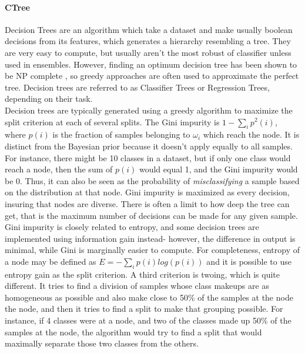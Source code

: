 \paragraph{CTree}
Decision Trees are an algorithm which take a dataset and make usually boolean decisions from its features, which generates a hierarchy resembling a tree.  They are very easy to compute, but usually aren't the most robust of classifier unless used in ensembles.  However, finding an optimum decision tree has been shown to be NP complete \cite{hyafil_constructing_1976}, so greedy approaches are often used to approximate the perfect tree.  Decision trees are referred to as Classifier Trees or Regression Trees, depending on their task.\\
Decision trees are typically generated using a greedy algorithm to maximize the split criterion at each of several splits.  The Gini impurity is $1-\sum_{i}p^2(i)$, where $p(i)$ is the fraction of samples belonging to $\omega_i$ which reach the node.  It is distinct from the Bayesian prior because it doesn't apply equally to all samples.  For instance, there might be 10 classes in a dataset, but if only one class would reach a node, then the sum of $p(i)$ would equal 1, and the Gini impurity would be 0. Thus, it can also be seen as the probability of \textit{misclassifying} a sample based on the distribution at that node. Gini impurity is maximized as every decision, insuring that nodes are diverse.  There is often a limit to how deep the tree can get, that is the maximum number of decisions can be made for any given sample.  Gini impurity is closely related to entropy, and some decision trees are implemented using information gain instead- however, the difference in output is minimal, while Gini is marginally easier to compute.  For completeness, entropy of a node may be defined as $E=-\sum_{i}p(i)log(p(i))$ and it is possible to use entropy gain as the split criterion.  A third criterion is twoing, which is quite different.  It tries to find a division of samples whose class makeups are as homogeneous as possible and also make close to 50\% of the samples at the node the node, and then it tries to find a split to make that grouping possible.  For instance, if 4 classes were at a node, and two of the classes made up 50\% of the samples at the node, the algorithm would try to find a split that would maximally separate those two classes from the others.  
\\
